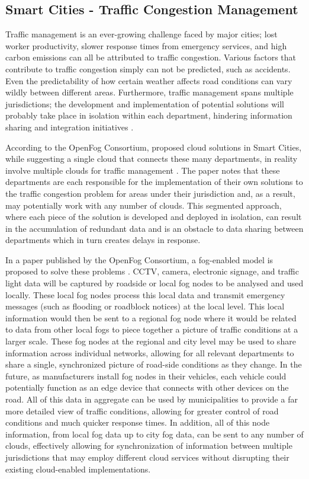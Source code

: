 \documentclass{article}
\begin{document}
\subsection{Smart Cities - Traffic Congestion Management}
Traffic management is an ever-growing challenge faced by major cities; lost worker productivity, slower response times from emergency services, and high carbon emissions can all be attributed to traffic congestion. Various factors that contribute to traffic congestion simply can not be predicted, such as accidents. Even the predictability of how certain weather affects road conditions can vary wildly between different areas. Furthermore, traffic management spans multiple jurisdictions; the development and implementation of potential solutions will probably take place in isolation within each department, hindering information sharing and integration initiatives \cite{openfogconsortium2017trafficmanagement}.

According to the OpenFog Consortium, proposed cloud solutions in Smart Cities, while suggesting a single cloud that connects these many departments, in reality involve multiple clouds for traffic management \cite{openfogconsortium2017trafficmanagement}. The paper notes that these departments are each responsible for the implementation of their own solutions to the traffic congestion problem for areas under their jurisdiction and, as a result, may potentially work with any number of clouds. This segmented approach, where each piece of the solution is developed and deployed in isolation, can result in the accumulation of redundant data and is an obstacle to data sharing between departments which in turn creates delays in response.

In a paper published by the OpenFog Consortium, a fog-enabled model is proposed to solve these problems \cite{openfogconsortium2017trafficmanagement}. CCTV, camera, electronic signage, and traffic light data will be captured by roadside or local fog nodes to be analysed and used locally. These local fog nodes process this local data and transmit emergency messages (such as flooding or roadblock notices) at the local level. This local information would then be sent to a regional fog node where it would be related to data from other local fogs to piece together a picture of traffic conditions at a larger scale. These fog nodes at the regional and city level may be used to share information across individual networks, allowing for all relevant departments to share a single, synchronized picture of road-side conditions as they change. In the future, as manufacturers install fog nodes in their vehicles, each vehicle could potentially function as an edge device that connects with other devices on the road. All of this data in aggregate can be used by municipalities to provide a far more detailed view of traffic conditions, allowing for greater control of road conditions and much quicker response times. In addition, all of this node information, from local fog data up to city fog data, can be sent to any number of clouds, effectively allowing for synchronization of information between multiple jurisdictions that may employ different cloud services without disrupting their existing cloud-enabled implementations.

\pagebreak

\renewcommand{\refname}{\section{References}}


\end{document}
